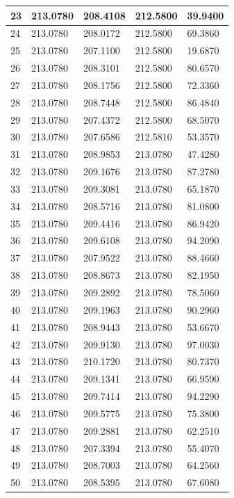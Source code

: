 \begin{longtable}{|l|l|l|l|l|}
23 & 213.0780 & 208.4108 & 212.5800 & 39.9400 \\\hline
24 & 213.0780 & 208.0172 & 212.5800 & 69.3860 \\\hline
25 & 213.0780 & 207.1100 & 212.5800 & 19.6870 \\\hline
26 & 213.0780 & 208.3101 & 212.5800 & 80.6570 \\\hline
27 & 213.0780 & 208.1756 & 212.5800 & 72.3360 \\\hline
28 & 213.0780 & 208.7448 & 212.5800 & 86.4840 \\\hline
29 & 213.0780 & 207.4372 & 212.5800 & 68.5070 \\\hline
30 & 213.0780 & 207.6586 & 212.5810 & 53.3570 \\\hline
31 & 213.0780 & 208.9853 & 213.0780 & 47.4280 \\\hline
32 & 213.0780 & 209.1676 & 213.0780 & 87.2780 \\\hline
33 & 213.0780 & 209.3081 & 213.0780 & 65.1870 \\\hline
34 & 213.0780 & 208.5716 & 213.0780 & 81.0800 \\\hline
35 & 213.0780 & 209.4416 & 213.0780 & 86.9420 \\\hline
36 & 213.0780 & 209.6108 & 213.0780 & 94.2090 \\\hline
37 & 213.0780 & 207.9522 & 213.0780 & 88.4660 \\\hline
38 & 213.0780 & 208.8673 & 213.0780 & 82.1950 \\\hline
39 & 213.0780 & 209.2892 & 213.0780 & 78.5060 \\\hline
40 & 213.0780 & 209.1963 & 213.0780 & 90.2960 \\\hline
41 & 213.0780 & 208.9443 & 213.0780 & 53.6670 \\\hline
42 & 213.0780 & 209.9130 & 213.0780 & 97.0030 \\\hline
43 & 213.0780 & 210.1720 & 213.0780 & 80.7370 \\\hline
44 & 213.0780 & 209.1341 & 213.0780 & 66.9590 \\\hline
45 & 213.0780 & 209.7414 & 213.0780 & 94.2290 \\\hline
46 & 213.0780 & 209.5775 & 213.0780 & 75.3800 \\\hline
47 & 213.0780 & 209.2881 & 213.0780 & 62.2510 \\\hline
48 & 213.0780 & 207.3394 & 213.0780 & 55.4070 \\\hline
49 & 213.0780 & 208.7003 & 213.0780 & 64.2560 \\\hline
50 & 213.0780 & 208.5395 & 213.0780 & 67.6080 \\\hline

\end{longtable}
